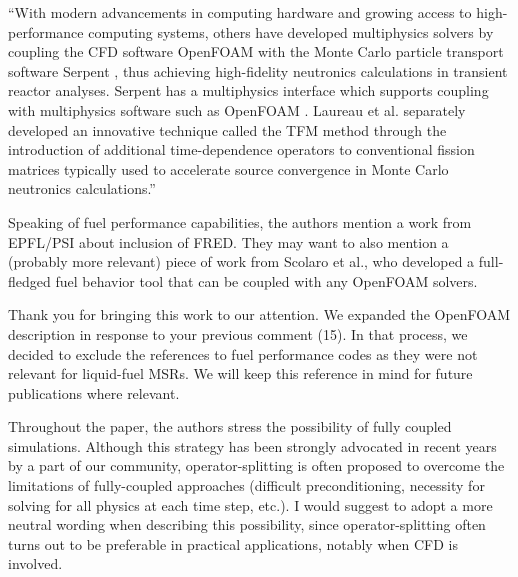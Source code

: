 \documentclass[answers,11pt]{exam}
\begin{document}
\begin{questions}
\begin{solution}
        	``With modern advancements in computing hardware and growing access to
high-performance computing systems, others have developed multiphysics solvers
by coupling the CFD software OpenFOAM
\cite{the_openfoam_foundation_ltd_openfoam_2021} with the Monte Carlo particle
transport software
Serpent \cite{leppanen_serpent_2014}, thus achieving high-fidelity neutronics
calculations in transient reactor analyses. Serpent has a multiphysics
interface which supports coupling with multiphysics software such as OpenFOAM
\cite{leppanen_development_2013}. Laureau et al. \cite{laureau_transient_2017}
separately developed an innovative technique called the
\gls{TFM} method through the introduction of additional time-dependence
operators to conventional fission matrices typically used to accelerate source
convergence in Monte Carlo neutronics calculations.''
        \end{solution}

        \question Speaking of fuel performance capabilities, the authors
        mention a work from EPFL/PSI about inclusion of FRED. They may want to
        also mention a (probably more relevant) piece of work from Scolaro et
        al., who
        developed a full-fledged fuel behavior tool that can be coupled with
        any OpenFOAM solvers.
        \begin{solution}
        	Thank you for bringing this work to our attention. We expanded the
        	OpenFOAM description in response to your previous comment (15). In
        	that process, we decided to exclude the references to fuel
        	performance codes as they were not relevant for liquid-fuel MSRs.
        	We will keep this reference in mind for future publications where
        	relevant.
        \end{solution}

        \question Throughout the paper, the authors stress the possibility of fully coupled simulations. Although this strategy has been strongly advocated in recent years by a part of our community, operator-splitting is often proposed to overcome the limitations of fully-coupled approaches (difficult preconditioning, necessity for solving for all physics at each time step, etc.).  I would suggest to adopt a more neutral wording when describing this possibility, since operator-splitting often turns out to be preferable in practical applications, notably when CFD is involved.


\end{questions}
\end{document}
